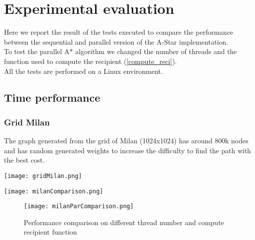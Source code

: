 \section{Experimental evaluation}
\label{Sec:experimental-eval}

Here we report the result of the tests executed to compare the performance between the sequential and parallel version of the A-Star implementation.\\
To test the parallel A* algorithm we changed the number of threads and the function used to compute the recipient (\ref{compute_reci}). \\
All the tests are performed on a Linux environment.

\subsection{Time performance}


\subsubsection{Grid Milan}
The graph generated from the grid of Milan (1024x1024) has around 800k nodes and has random generated weights to increase the difficulty to find the path with the best cost.

\begin{center} 
    \begin{minipage}[b]{0.3\textwidth}
            \centering
            \texttt{[image: gridMilan.png]}
            \label{Milan-grid}
        
    \end{minipage}%
    \hspace{0.5cm}
    \begin{minipage}[b]{0.6\textwidth}
            \centering
            \texttt{[image: milanComparison.png]}
            \label{Milan-comp}
    \end{minipage} 
\end{center}


\begin{figure}
    \centering
    \texttt{[image: milanParComparison.png]}
    \caption{Performance comparison on different thread number and compute recipient function}
    \label{Milan-par-comp}
\end{figure}


